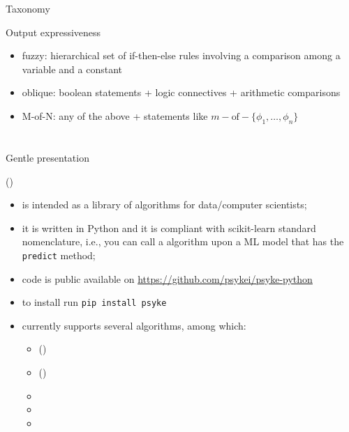 \documentclass[presentation]{beamer}\mode<presentation>{\usetheme{AMSBolognaFC}}
\begin{document}
\begin{frame}[allowframebreaks]{Taxonomy}
\begin{block}{Output expressiveness}
\begin{itemize}
            \item fuzzy: hierarchical set of if-then-else rules involving a comparison among a variable and a constant   
            \item oblique: boolean statements + logic connectives + arithmetic comparisons
            \item M-of-N: any of the above + statements like $m-\text{of}-\{\phi_1, \ldots, \phi_n \}$
        \end{itemize} 
        
    \end{block}
\end{frame}


\section{\longpsyke}

\begin{frame}[c]{Gentle presentation}
    \begin{block}{\longpsyke{} (\psyke) }
        \begin{itemize}
            \item \psyki{} is intended as a library of \ske{} algorithms for data/computer scientists;
            \item it is written in Python and it is compliant with scikit-learn standard nomenclature, i.e., you can call a \ske{} algorithm upon a ML model that has the \texttt{predict} method;
            \item code is public available on \href{https://github.com/psykei/psyke-python}{https://github.com/psykei/psyke-python}
            \item to install run \texttt{pip install psyke}
            \item currently \psyke{} supports several \ski{} algorithms, among which:
            \begin{itemize}
                \item \longcart{} (\cart) 
                \item \longreal{} (\real) 
                \item \trepan{} 
                \item \iter{} 
                \item \gridex{} 
            \end{itemize}
        \end{itemize}
    \end{block}
\end{frame}
\end{document}
